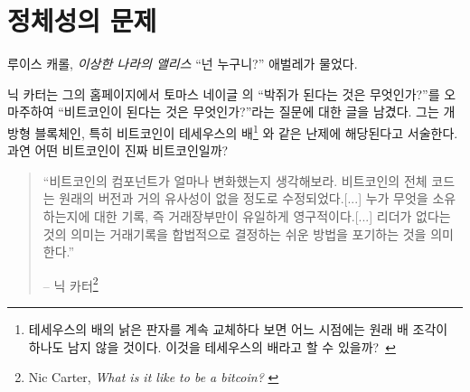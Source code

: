 \chapter{정체성의 문제}
\label{les:4}

\begin{chapquote}{루이스 캐롤, \textit{이상한 나라의 앨리스}}
	\enquote{넌 누구니?} 애벌레가 물었다.
\end{chapquote}

닉 카터는 그의 홈페이지에서 토마스 네이글
의 \enquote{박쥐가 된다는 것은 무엇인가?}를 오마주하여 
\enquote{비트코인이 된다는 것은 무엇인가?}라는 질문에 대한 글을 남겼다. 
그는 개방형 블록체인, 특히 비트코인이 테세우스의 배\footnote{테세우스의 배의 낡은 판자를 계속 교체하다 보면 어느 시점에는 원래 배 조각이 하나도 남지 않을 것이다. 이것을 테세우스의 배라고 할 수 있을까?~\cite{wiki:theseus}}
와 같은 난제에 해당된다고 서술한다.
과연 어떤 비트코인이 진짜 비트코인일까?

\begin{quotation}\begin{samepage}
		\enquote{비트코인의 컴포넌트가 얼마나 변화했는지 생각해보라. 비트코인의 전체 코드는
			원래의 버전과 거의 유사성이 없을 정도로 수정되었다.[...] 누가 무엇을 소유하는지에 대한
			기록, 즉 거래장부만이 유일하게 영구적이다.[...] 리더가 없다는 것의 의미는
			거래기록을 합법적으로 결정하는 쉬운 방법을 포기하는 것을 의미한다.}
		\begin{flushright} -- 닉 카터\footnote{Nic Carter, \textit{What is it like to be a bitcoin?} \cite{bitcoin-identity}}
\end{flushright}\end{samepage}\end{quotation}


